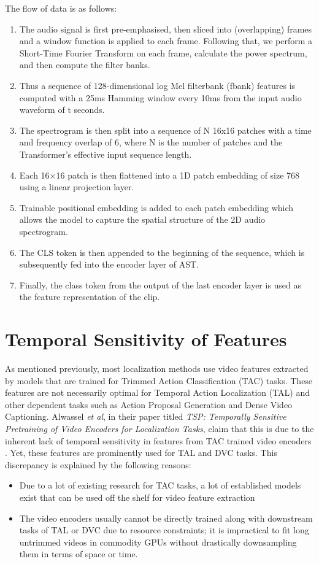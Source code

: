 \par The flow of data is as follows:
\begin{enumerate}
	\item The audio signal is first pre-emphasised, then sliced into (overlapping) frames and a window function is applied to each frame. Following that, we perform a Short-Time Fourier Transform on each frame, calculate the power spectrum, and then compute the filter banks.
	\item Thus a sequence of 128-dimensional log Mel filterbank (fbank) features is computed with a 25ms Hamming window every 10ms from the input audio waveform of t seconds. 
	\item The spectrogram is then split into a sequence of N 16x16 patches with a time and frequency overlap of 6, where N is the number of patches and the Transformer's effective input sequence length.
	\item Each 16×16 patch is then flattened into a 1D patch embedding of size 768 using a linear projection layer. 
	\item Trainable positional embedding is added to each patch embedding which allows the model to capture the spatial structure of the 2D audio spectrogram.
	\item The CLS token is then appended to the beginning of the sequence, which is subsequently fed into the encoder layer of AST.
	\item Finally, the class token from the output of the last encoder layer is used as the feature representation of the clip.
	
\end{enumerate}
  

\section{Temporal Sensitivity of Features}
\par As mentioned previously, most localization methods use video features extracted by models that are trained for Trimmed Action Classification (TAC) tasks. These features are not necessarily optimal for Temporal Action Localization (TAL) and other dependent tasks such as Action Proposal Generation and Dense Video Captioning. Alwassel \textit{et al}, in their paper titled \textit{TSP: Temporally Sensitive Pretraining of Video Encoders for Localization Tasks}, claim that this is due to the inherent lack of temporal sensitivity in features from TAC trained video encoders \cite{alwassel2021tsp}. Yet, these features are prominently used for TAL and DVC tasks. This discrepancy is explained by the following reasons:
\begin{itemize}
	\item Due to a lot of existing research for TAC tasks, a lot of established models exist that can be used off the shelf for video feature extraction
	\item The video encoders usually cannot be directly trained along with downstream tasks of TAL or DVC due to resource constraints; it is impractical to fit long untrimmed videos in commodity GPUs without drastically downsampling them in terms of space or time.
\end{itemize}

